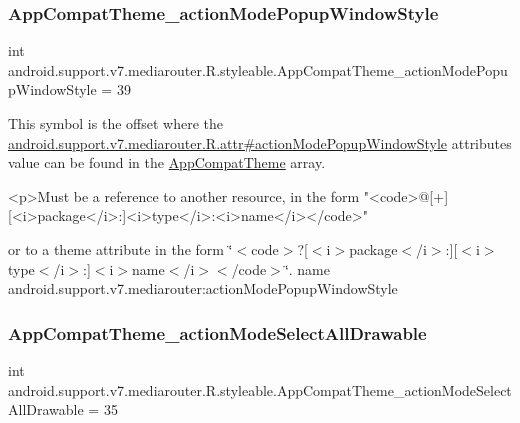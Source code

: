 \subsubsection{\texorpdfstring{App\+Compat\+Theme\+\_\+action\+Mode\+Popup\+Window\+Style}{AppCompatTheme\_actionModePopupWindowStyle}}
{\footnotesize\ttfamily int android.\+support.\+v7.\+mediarouter.\+R.\+styleable.\+App\+Compat\+Theme\+\_\+action\+Mode\+Popup\+Window\+Style = 39\hspace{0.3cm}{\ttfamily [static]}}

This symbol is the offset where the \hyperlink{classandroid_1_1support_1_1v7_1_1mediarouter_1_1R_1_1attr_a5a19706a14edef61062706ec17d5d024}{android.\+support.\+v7.\+mediarouter.\+R.\+attr\#action\+Mode\+Popup\+Window\+Style} attribute\textquotesingle{}s value can be found in the \hyperlink{classandroid_1_1support_1_1v7_1_1mediarouter_1_1R_1_1styleable_a4e3d3900c75d49aeb2f283cac00214d6}{App\+Compat\+Theme} array.

\begin{DoxyVerb}      <p>Must be a reference to another resource, in the form "<code>@[+][<i>package</i>:]<i>type</i>:<i>name</i></code>"
\end{DoxyVerb}
 or to a theme attribute in the form \char`\"{}$<$code$>$?\mbox{[}$<$i$>$package$<$/i$>$\+:\mbox{]}\mbox{[}$<$i$>$type$<$/i$>$\+:\mbox{]}$<$i$>$name$<$/i$>$$<$/code$>$\char`\"{}.  name android.\+support.\+v7.\+mediarouter\+:action\+Mode\+Popup\+Window\+Style \mbox{\label{classandroid_1_1support_1_1v7_1_1mediarouter_1_1R_1_1styleable_a8e509977527febb24aa3df6255a62133}} 
\subsubsection{\texorpdfstring{App\+Compat\+Theme\+\_\+action\+Mode\+Select\+All\+Drawable}{AppCompatTheme\_actionModeSelectAllDrawable}}
{\footnotesize\ttfamily int android.\+support.\+v7.\+mediarouter.\+R.\+styleable.\+App\+Compat\+Theme\+\_\+action\+Mode\+Select\+All\+Drawable = 35\hspace{0.3cm}{\ttfamily [static]}}

